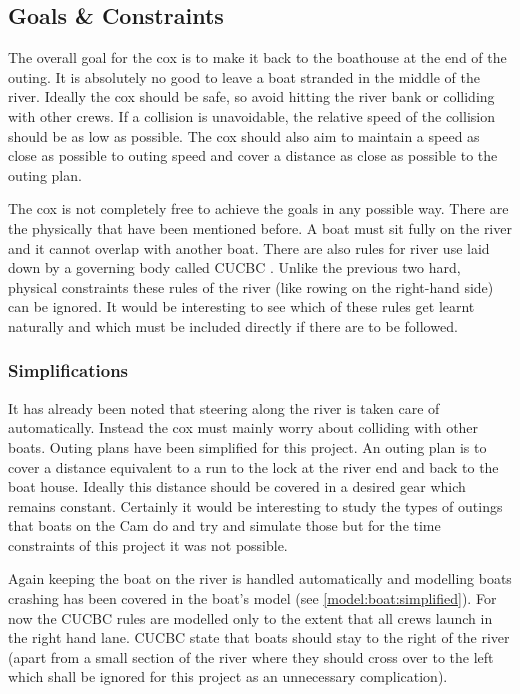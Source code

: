       \subsection{Goals \& Constraints}
      The overall goal for the cox is to make it back to the boathouse at the end of the outing. It is absolutely no good to leave a boat stranded in the middle of the river. Ideally the cox should be safe, so avoid hitting the river bank or colliding with other crews. If a collision is unavoidable, the relative speed of the collision should be as low as possible. The cox should also aim to maintain a speed as close as possible to outing speed and cover a distance as close as possible to the outing plan.
      
      The cox is not completely free to achieve the goals in any possible way. There are the physically that have been mentioned before. A boat must sit fully on the river and it cannot overlap with another boat. There are also rules for river use laid down by a governing body called CUCBC \cite{CUCBC}. Unlike the previous two hard, physical constraints these rules of the river (like rowing on the right-hand side) can be ignored. It would be interesting to see which of these rules get learnt naturally and which must be included directly if there are to be followed.
      
      \subsubsection{Simplifications} \label{model:cox:goals:simplifications}
      It has already been noted that steering along the river is taken care of automatically. Instead the cox must mainly worry about colliding with other boats. Outing plans have been simplified for this project. An outing plan is to cover a distance equivalent to a run to the lock at the river end and back to the boat house. Ideally this distance should be covered in a desired gear which remains constant. Certainly it would be interesting to study the types of outings that boats on the Cam do and try and simulate those but for the time constraints of this project it was not possible.
      
      Again keeping the boat on the river is handled automatically and modelling boats crashing has been covered in the boat's model (see \ref{model:boat:simplified}). For now the CUCBC rules are modelled only to the extent that all crews launch in the right hand lane. CUCBC state that boats should stay to the right of the river (apart from a small section of the river where they should cross over to the left which shall be ignored for this project as an unnecessary complication).
      
